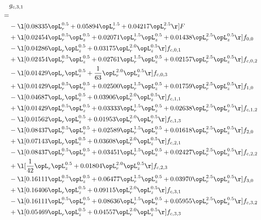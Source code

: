 \begin{alignat}{2} 
\label{eq:g_31_0} 
& g_{c,3,1} \nonumber \\ 
 = \\ 
& - \l[  0.08335 \opL_r^{0.5} +  0.05894 \opL_r^{1.5} +  0.04217 \opL_r^{2.5}  \r] F \nonumber \\ 
& + \l[  0.02454 \opL_r^{0.5} \opL_z^{0.5} +  0.02071 \opL_r^{1.5} \opL_z^{0.5} +  0.01438 \opL_r^{2.5} \opL_z^{0.5}  \r] f_{0,0} \nonumber \\ 
& - \l[  0.04286 \opL_r \opL_z^{0.5} +  0.03175 \opL_r^{2.0} \opL_z^{0.5}  \r] f_{c,0,1} \nonumber \\ 
& + \l[  0.02454 \opL_r^{0.5} \opL_z^{0.5} +  0.02761 \opL_r^{1.5} \opL_z^{0.5} +  0.02157 \opL_r^{2.5} \opL_z^{0.5}  \r] f_{c,0,2} \nonumber \\ 
& - \l[  0.01429 \opL_r \opL_z^{0.5} + \frac{1}{63} \opL_r^{2.0} \opL_z^{0.5}  \r] f_{c,0,3} \nonumber \\ 
& + \l[  0.01429 \opL_r^{0.5} \opL_z^{0.5} +  0.02500 \opL_r^{1.5} \opL_z^{0.5} +  0.01759 \opL_r^{2.5} \opL_z^{0.5}  \r] f_{1,0} \nonumber \\ 
& - \l[  0.04687 \opL_r \opL_z^{0.5} +  0.03906 \opL_r^{2.0} \opL_z^{0.5}  \r] f_{c,1,1} \nonumber \\ 
& + \l[  0.01429 \opL_r^{0.5} \opL_z^{0.5} +  0.03333 \opL_r^{1.5} \opL_z^{0.5} +  0.02638 \opL_r^{2.5} \opL_z^{0.5}  \r] f_{c,1,2} \nonumber \\ 
& - \l[  0.01562 \opL_r \opL_z^{0.5} +  0.01953 \opL_r^{2.0} \opL_z^{0.5}  \r] f_{c,1,3} \nonumber \\ 
& - \l[  0.08437 \opL_r^{0.5} \opL_z^{0.5} +  0.02589 \opL_r^{1.5} \opL_z^{0.5} +  0.01618 \opL_r^{2.5} \opL_z^{0.5}  \r] f_{2,0} \nonumber \\ 
& + \l[  0.07143 \opL_r \opL_z^{0.5} +  0.03608 \opL_r^{2.0} \opL_z^{0.5}  \r] f_{c,2,1} \nonumber \\ 
& - \l[  0.08437 \opL_r^{0.5} \opL_z^{0.5} +  0.03451 \opL_r^{1.5} \opL_z^{0.5} +  0.02427 \opL_r^{2.5} \opL_z^{0.5}  \r] f_{c,2,2} \nonumber \\ 
& + \l[ \frac{1}{42} \opL_r \opL_z^{0.5} +  0.01804 \opL_r^{2.0} \opL_z^{0.5}  \r] f_{c,2,3} \nonumber \\ 
& - \l[  0.16111 \opL_r^{0.5} \opL_z^{0.5} +  0.06477 \opL_r^{1.5} \opL_z^{0.5} +  0.03970 \opL_r^{2.5} \opL_z^{0.5}  \r] f_{3,0} \nonumber \\ 
& + \l[  0.16406 \opL_r \opL_z^{0.5} +  0.09115 \opL_r^{2.0} \opL_z^{0.5}  \r] f_{c,3,1} \nonumber \\ 
& - \l[  0.16111 \opL_r^{0.5} \opL_z^{0.5} +  0.08636 \opL_r^{1.5} \opL_z^{0.5} +  0.05955 \opL_r^{2.5} \opL_z^{0.5}  \r] f_{c,3,2} \nonumber \\ 
& + \l[  0.05469 \opL_r \opL_z^{0.5} +  0.04557 \opL_r^{2.0} \opL_z^{0.5}  \r] f_{c,3,3} \nonumber \\ 
\end{alignat} 


